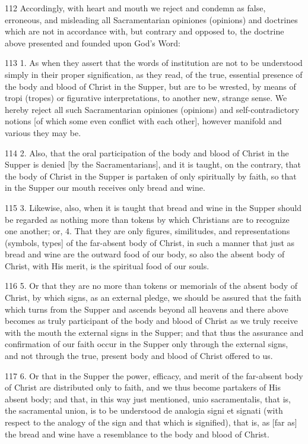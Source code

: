 112 Accordingly, with heart and mouth we reject and condemn as false, erroneous, and misleading all Sacramentarian opiniones (opinions) and doctrines which are not in accordance with, but contrary and opposed to, the doctrine above presented and founded upon God’s Word:

113 1. As when they assert that the words of institution are not to be understood simply in their proper signification, as they read, of the true, essential presence of the body and blood of Christ in the Supper, but are to be wrested, by means of tropi (tropes) or figurative interpretations, to another new, strange sense. We hereby reject all such Sacramentarian opiniones (opinions) and self-contradictory notions [of which some even conflict with each other], however manifold and various they may be.

114 2. Also, that the oral participation of the body and blood of Christ in the Supper is denied [by the Sacramentarians], and it is taught, on the contrary, that the body of Christ in the Supper is partaken of only spiritually by faith, so that in the Supper our mouth receives only bread and wine.

115 3. Likewise, also, when it is taught that bread and wine in the Supper should be regarded as nothing more than tokens by which Christians are to recognize one another; or,
4. That they are only figures, similitudes, and representations (symbols, types] of the far-absent body of Christ, in such a manner that just as bread and wine are the outward food of our body, so also the absent body of Christ, with His merit, is the spiritual food of our souls.

116 5. Or that they are no more than tokens or memorials of the absent body of Christ, by which signs, as an external pledge, we should be assured that the faith which turns from the Supper and ascends beyond all heavens and there above becomes as truly participant of the body and blood of Christ as we truly receive with the mouth the external signs in the Supper; and that thus the assurance and confirmation of our faith occur in the Supper only through the external signs, and not through the true, present body and blood of Christ offered to us.

117 6. Or that in the Supper the power, efficacy, and merit of the far-absent body of Christ are distributed only to faith, and we thus become partakers of His absent body; and that, in this way just mentioned, unio sacramentalis, that is, the sacramental union, is to be understood de analogia signi et signati (with respect to the analogy of the sign and that which is signified), that is, as [far as] the bread and wine have a resemblance to the body and blood of Christ.

